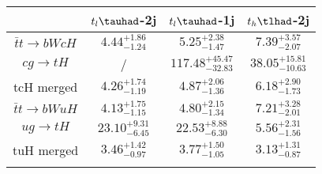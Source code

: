\centering
\begin{tabular}{cccc} \toprule\toprule
 & $t_l\tauhad$-2j & $t_l\tauhad$-1j & $t_h\tlhad$-2j\\\midrule
$\bar{t}t\to bWcH$ & $4.44^{+1.86}_{-1.24}$ & $5.25^{+2.38}_{-1.47}$ & $7.39^{+3.57}_{-2.07}$\\
$cg\to tH$ &  / & $117.48^{+45.47}_{-32.83}$ & $38.05^{+15.81}_{-10.63}$\\
tcH merged & $4.26^{+1.74}_{-1.19}$ & $4.87^{+2.06}_{-1.36}$ & $6.18^{+2.90}_{-1.73}$\\
$\bar{t}t\to bWuH$ & $4.13^{+1.75}_{-1.15}$ & $4.80^{+2.15}_{-1.34}$ & $7.21^{+3.28}_{-2.01}$\\
$ug\to tH$ & $23.10^{+9.31}_{-6.45}$ & $22.53^{+8.88}_{-6.30}$ & $5.56^{+2.31}_{-1.56}$\\
tuH merged & $3.46^{+1.42}_{-0.97}$ & $3.77^{+1.50}_{-1.05}$ & $3.13^{+1.31}_{-0.87}$\\
\bottomrule\bottomrule\\
\end{tabular}

